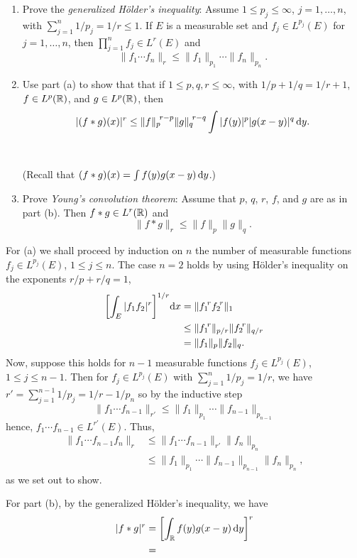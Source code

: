 \begin{problem}
  \hfill
  \begin{enumerate}[label=(\alph*),noitemsep]
  \item Prove the \emph{generalized Hölder's inequality}: Assume
    \(1\leq p_j\leq\infty\), \(j=1,\dotsc,n\), with
    \(\sum_{j=1}^n 1/p_j=1/r\leq 1\). If \(E\) is a measurable set and
    \(f_j\in L^{p_j}(E)\) for \(j=1,\dotsc,n\), then
    \(\prod_{j=1}^n f_j\in L^r(E)\) and
    \[
      \|f_1\dotsm f_n\|_r\leq\|f_1\|_{p_1}\dotsm\|f_n\|_{p_n}.
    \]
  \item Use part (a) to show that that if \(1\leq p,q,r\leq\infty\), with
    \(1/p+1/q=1/r+1\), \(f\in L^p(\mathbb{R})\), and \(g\in L^p(\mathbb{R})\), then
    \[
      |(f*g)(x)|^r\leq{\|f\|_p}^{\!r-p}{\|g\|_q}^{\!r-q}\int|f(y)|^p|g(x-y)|^q\mathop{}\!\mathrm{d}
      y.
    \]
    \\\\
    (Recall that \((f*g)(x)=\int f(y)g(x-y)\mathop{}\!\mathrm{d} y\).)
  \item Prove \emph{Young's convolution theorem}: Assume that \(p\), \(q\),
    \(r\), \(f\), and \(g\) are as in part (b). Then \(f*g\in L^r(\mathbb{R})\)
    and
    \[
      \|f*g\|_r\leq\|f\|_p\|g\|_q.
    \]
  \end{enumerate}
\end{problem}
\begin{solution}
  For (a) we shall proceed by induction on \(n\) the number of measurable
  functions \(f_j\in L^{p_j}(E)\), \(1\leq j\leq n\). The case \(n=2\)
  holds by using Hölder's inequality on the exponents \(r/p+r/q=1\),
  \begin{align*}
    \biggl[\int_E|f_1f_2|^r\biggr]^{1/r}\mathrm{d} x
    &=\|{f_1}^{\!r}{f_2}^{\!r}\|_1\\
    &\leq\|{f_1}^{\!r}\|_{p/r}\|{f_2}^{\!r}\|_{q/r}\\
    &=\|f_1\|_p\|f_2\|_q.
  \end{align*}
  Now, suppose this holds for \(n-1\) measurable functions
  \(f_j\in L^{p_j}(E)\), \(1\leq j\leq n-1\). Then for
  \(f_j\in L^{p_j}(E)\) with \(\sum_{j=1}^n 1/p_j=1/r\), we have
  \(r'=\sum_{j=1}^{n-1}1/p_j=1/r-1/p_n\) so by the inductive step
  \[
    \|f_1\dotsm f_{n-1}\|_{r'}\leq%
    \|f_1\|_{p_1}\dotsm\|f_{n-1}\|_{p_{n-1}}
  \]
  hence, \(f_1\dotsm f_{n-1}\in L^{r'}(E)\). Thus,
  \begin{align*}
    \|f_1\dotsm f_{n-1}f_n\|_r
    &\leq \|f_1\dotsm f_{n-1}\|_{r'}\|f_n\|_{p_n}\\
    &\leq\|f_1\|_{p_1}\dotsm\|f_{n-1}\|_{p_{n-1}}\|f_n\|_{p_n},
  \end{align*}
  as we set out to show.

  For part (b), by the generalized Hölder's inequality, we have
  \begin{align*}
    |f*g|^r
    &=\biggl[\int_{\mathbb{R}} f(y)g(x-y)\mathop{}\!\mathrm{d} y\biggr]^r\\
    &=
  \end{align*}
\end{solution}

